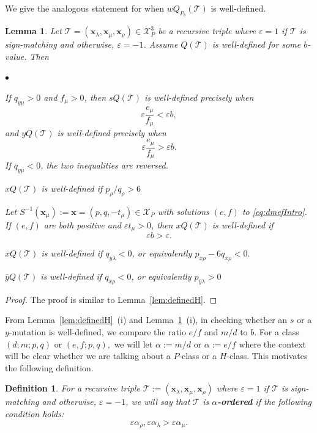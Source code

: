 \documentclass[11pt, reqno]{amsart}
\newtheorem{lemma}[thm]{Lemma}
\newtheorem{definition}[thm]{Definition}
\theoremstyle{remark}
\numberwithin{equation}{subsection}
\numberwithin{figure}{section}
\theoremstyle{customremark}
\newcommand{\Tt}{\mathcal{T}}
\newenvironment{itemlist}
   { \begin{list} {$\bullet$}
         { \setlength{\topsep}{.5ex}  \setlength{\itemsep}{.5ex} \setlength{\leftmargin}{2.5ex} } }
   { \end{list} }
\newcommand{\ovx}{{\ov{x}}}
\newcommand{\ovy}{{\ov{y}}}
\newcommand{\ov}{\overline}
\newcommand{\al}{{\alpha}}
\newcommand{\la}{{\lambda}}
\newcommand{\eps}{\varepsilon}
\newcommand{\X}{\mathcal{X}}
\begin{document}
We give the analogous statement for when $wQ_{P_b}(\Tt)$ is well-defined. 
\begin{lemma} \label{lem:definedP}
    Let $\Tt=(\bm{x}_\la,\bm{x}_\mu,\bm{x}_\rho) \in \X_P^3$ be a recursive triple where $\eps=1$ if $\Tt$ is sign-matching and otherwise, $\eps=-1$. Assume $Q(\Tt)$ is well-defined for some $b$-value. Then
    \begin{itemlist}
        \item[{(i)}]  If \(q_{y\mu}>0\) and $f_\mu>0$, then \(sQ(\Tt)\) is well-defined precisely when
\[
        \eps\frac{e_\mu}{f_\mu}<\eps b,
\]
and \(yQ(\Tt)\) is well-defined precisely when
\[
        \eps\frac{e_\mu}{f_\mu}>\eps b.
\]
If \(q_{y\mu}<0\), the two inequalities are reversed.
        
       
        \item[{(ii)}] $xQ(\Tt)$ is well-defined if $p_\rho/q_\rho>6$
        \item[{(iii)}] Let $S^{-1}(\bm{x}_\mu):=\bm{x}=(p,q,-t_\mu) \in\X_P$ with solutions $(e,f)$ to \eqref{eq:dmefIntro}. If $(e,f)$ are both positive and $\eps t_\mu>0$, then $xQ(\Tt)$ is well-defined if
        \[ \eps b>\eps.\]
  \item[{(iv)}] $\ovx Q(\Tt)$ is well-defined if $q_{\ovy\la}<0$, or equivalently 
  $p_{\ov{x}\rho}-6q_{\ov{x}\rho}<0.$
        
        \item[{(v)}] $\ovy Q(\Tt)$ is well-defined if $q_{\ovx\rho}<0$, or equivalently $p_{\ovy\la}>0$

    \end{itemlist}
\end{lemma}
\begin{proof}
    The proof is similar to Lemma~\ref{lem:definedH}. 
\end{proof}

From Lemma~\ref{lem:definedH}~(i) and Lemma~\ref{lem:definedP}~(i), in checking whether an $s$ or a $y$-mutation is well-defined, we compare the ratio $e/f$ and $m/d$ to $b$. For a class $(d;m;p,q)$ or $(e,f;p,q),$ we will let $\al:=m/d$ or $\al:=e/f$ where the context will be clear whether we are talking about a $P$-class or a $H$-class. This motivates the following definition. 
\begin{definition}
For a recursive triple $\Tt:=(\bm{x}_\la,\bm{x}_\mu,\bm{x}_\rho)$ where $\eps=1$ if $\Tt$ is sign-matching and otherwise, $\eps=-1$, we will say that $\Tt$ is {\bf $\al$-ordered} if the following condition holds:
\[\eps\al_\rho,\eps\al_\la>\eps\al_\mu.\] 


\end{definition} 
\end{document}
